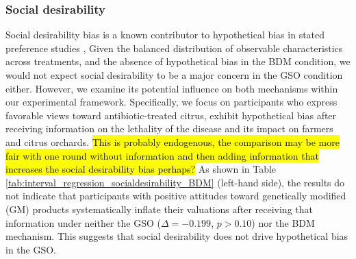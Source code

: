 \documentclass[12pt]{article}
\begin{document}
\subsubsection{Social desirability}
Social desirability bias is a known contributor to hypothetical bias in stated preference studies \citep{lopez2021social, norwood2011social}, Given the balanced distribution of observable characteristics across treatments, and the absence of hypothetical bias in the BDM condition, we would not expect social desirability to be a major concern in the GSO condition either. However, we examine its potential influence on both mechanisms within our experimental framework. Specifically, we focus on participants who express favorable views toward antibiotic-treated citrus, exhibit hypothetical bias after receiving information on the lethality of the disease and its impact on farmers and citrus orchards. \hl{This is probably endogenous, the comparison may be more fair with one round without information and then adding information that increases the social desirability bias perhaps?} As shown in Table \ref{tab:interval_regression_socialdesirability_BDM} (left-hand side), the results do not indicate that participants with positive attitudes toward genetically modified (GM) products systematically inflate their valuations after receiving that information under neither the GSO (\(\Delta = -0.199\), \(p > 0.10\)) nor the BDM mechanism. This suggests that social desirability does not drive hypothetical bias in the GSO.
\end{document}

